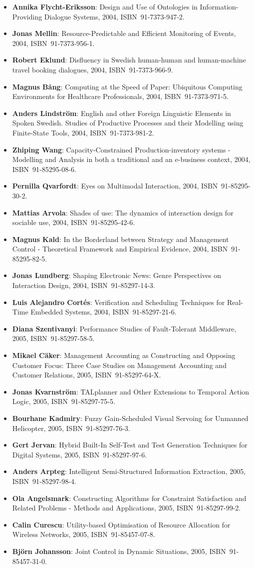 \documentclass[a4paper,showtrims,twocolumn]{memoir}
\newenvironment{theses}{
  \begin{itemize}
    \setlength{\itemsep}{0.2em}
    \setlength{\parskip}{0em}
    \setlength{\parsep}{0em}
}{
  \end{itemize}
}
\newcommand{\thesis}[5]{\item[No.~#1] \textbf{#2}: #3, #4, ISBN~#5.}
\begin{document}
\begin{theses}
    \thesis{874}{Annika Flycht-Eriksson}{Design and Use of Ontologies in Information-Providing Dialogue Systems}{2004}{91-7373-947-2}
    \thesis{876}{Jonas Mellin}{Resource-Predictable and Efficient Monitoring of Events}{2004}{91-7373-956-1}
    \thesis{882}{Robert Eklund}{Disfluency in Swedish human-human and human-machine travel booking dialogues}{2004}{91-7373-966-9}
    \thesis{883}{Magnus Bång}{Computing at the Speed of Paper: Ubiquitous Computing Environments for Healthcare Professionals}{2004}{91-7373-971-5}
    \thesis{887}{Anders Lindström}{English and other Foreign Linguistic Elements in Spoken Swedish. Studies of Productive Processes and their Modelling using Finite-State Tools}{2004}{91-7373-981-2}
    \thesis{889}{Zhiping Wang}{Capacity-Constrained Production-inventory systems - Modelling and Analysis in both a traditional and an e-business context}{2004}{91-85295-08-6}
    \thesis{893}{Pernilla Qvarfordt}{Eyes on Multimodal Interaction}{2004}{91-85295-30-2}
    \thesis{900}{Mattias Arvola}{Shades of use: The dynamics of interaction design for sociable use}{2004}{91-85295-42-6}
    \thesis{910}{Magnus Kald}{In the Borderland between Strategy and Management Control - Theoretical Framework and Empirical Evidence}{2004}{91-85295-82-5}
    \thesis{918}{Jonas Lundberg}{Shaping Electronic News: Genre Perspectives on Interaction Design}{2004}{91-85297-14-3}
    \thesis{920}{Luis Alejandro Cortés}{Verification and Scheduling Techniques for Real-Time Embedded Systems}{2004}{91-85297-21-6}
    \thesis{929}{Diana Szentivanyi}{Performance Studies of Fault-Tolerant Middleware}{2005}{91-85297-58-5}
    \thesis{933}{Mikael Cäker}{Management Accounting as Constructing and Opposing Customer Focus: Three Case Studies on Management Accounting and Customer Relations}{2005}{91-85297-64-X}
    \thesis{937}{Jonas Kvarnström}{TALplanner and Other Extensions to Temporal Action Logic}{2005}{91-85297-75-5}
    \thesis{938}{Bourhane Kadmiry}{Fuzzy Gain-Scheduled Visual Servoing for Unmanned Helicopter}{2005}{91-85297-76-3}
    \thesis{945}{Gert Jervan}{Hybrid Built-In Self-Test and Test Generation Techniques for Digital Systems}{2005}{91-85297-97-6}
    \thesis{946}{Anders Arpteg}{Intelligent Semi-Structured Information Extraction}{2005}{91-85297-98-4}
    \thesis{947}{Ola Angelsmark}{Constructing Algorithms for Constraint Satisfaction and Related Problems - Methods and Applications}{2005}{91-85297-99-2}
    \thesis{963}{Calin Curescu}{Utility-based Optimisation of Resource Allocation for Wireless Networks}{2005}{91-85457-07-8}
    \thesis{972}{Björn Johansson}{Joint Control in Dynamic Situations}{2005}{91-85457-31-0}

\end{theses}
\end{document}
